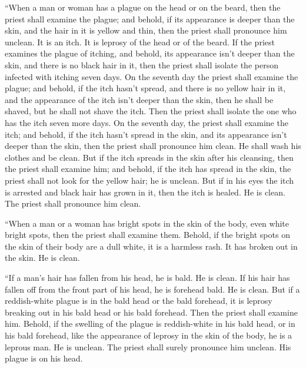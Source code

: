  ``When a man or woman has a plague on the head or on the
beard,  then the priest shall examine the plague; and
behold, if its appearance is deeper than the skin, and the hair in it is
yellow and thin, then the priest shall pronounce him unclean. It is an
itch. It is leprosy of the head or of the beard.  If the
priest examines the plague of itching, and behold, its appearance isn't
deeper than the skin, and there is no black hair in it, then the priest
shall isolate the person infected with itching seven days. 
On the seventh day the priest shall examine the plague; and behold, if
the itch hasn't spread, and there is no yellow hair in it, and the
appearance of the itch isn't deeper than the skin,  then he
shall be shaved, but he shall not shave the itch. Then the priest shall
isolate the one who has the itch seven more days.  On the
seventh day, the priest shall examine the itch; and behold, if the itch
hasn't spread in the skin, and its appearance isn't deeper than the
skin, then the priest shall pronounce him clean. He shall wash his
clothes and be clean.  But if the itch spreads in the skin
after his cleansing,  then the priest shall examine him;
and behold, if the itch has spread in the skin, the priest shall not
look for the yellow hair; he is unclean.  But if in his
eyes the itch is arrested and black hair has grown in it, then the itch
is healed. He is clean. The priest shall pronounce him clean.

 ``When a man or a woman has bright spots in the skin of
the body, even white bright spots,  then the priest shall
examine them. Behold, if the bright spots on the skin of their body are
a dull white, it is a harmless rash. It has broken out in the skin. He
is clean.

 ``If a man's hair has fallen from his head, he is bald. He
is clean.  If his hair has fallen off from the front part
of his head, he is forehead bald. He is clean.  But if a
reddish-white plague is in the bald head or the bald forehead, it is
leprosy breaking out in his bald head or his bald forehead.
 Then the priest shall examine him. Behold, if the swelling
of the plague is reddish-white in his bald head, or in his bald
forehead, like the appearance of leprosy in the skin of the body,
 he is a leprous man. He is unclean. The priest shall
surely pronounce him unclean. His plague is on his head.

